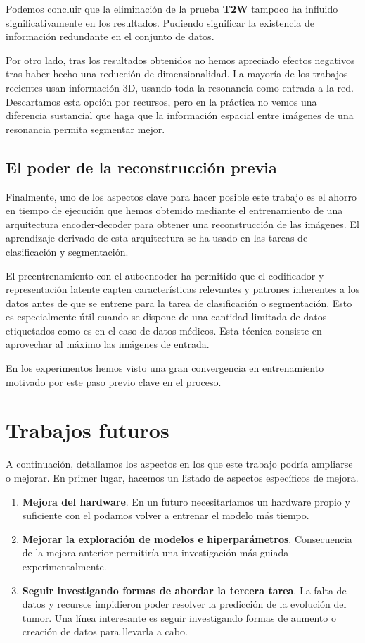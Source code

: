 Podemos concluir que la eliminación de la prueba \textbf{T2W} tampoco ha influido significativamente en los resultados. Pudiendo significar la existencia de información redundante en el conjunto de datos.

Por otro lado, tras los resultados obtenidos no hemos apreciado efectos negativos tras haber hecho una reducción de dimensionalidad. La mayoría de los trabajos recientes usan información 3D, usando toda la resonancia como entrada a la red. Descartamos esta opción por recursos, pero en la práctica no vemos una diferencia sustancial que haga que la información espacial entre imágenes de una resonancia permita segmentar mejor.


\subsection{El poder de la reconstrucción previa}

Finalmente, uno de los aspectos clave para hacer posible este trabajo es el ahorro en tiempo de ejecución que hemos obtenido mediante el entrenamiento de una arquitectura encoder-decoder para obtener una reconstrucción de las imágenes. El aprendizaje derivado de esta arquitectura se ha usado en las tareas de clasificación y segmentación.

El preentrenamiento con el autoencoder ha permitido que el codificador y representación latente capten características relevantes y patrones inherentes a los datos antes de que se entrene para la tarea de clasificación o segmentación. Esto es especialmente útil cuando se dispone de una cantidad limitada de datos etiquetados como es en el caso de datos médicos. Esta técnica consiste en aprovechar al máximo las imágenes de entrada.

En los experimentos hemos visto una gran convergencia en entrenamiento motivado por este paso previo clave en el proceso.

\section{Trabajos futuros}

A continuación, detallamos los aspectos en los que este trabajo podría ampliarse o mejorar. En primer lugar, hacemos un listado de aspectos específicos de mejora.

\begin{enumerate}
	\item \textbf{Mejora del hardware}. En un futuro necesitaríamos un hardware propio y suficiente con el podamos volver a entrenar el modelo más tiempo.
	\item \textbf{Mejorar la exploración de modelos e hiperparámetros}. Consecuencia de la mejora anterior permitiría una investigación más guiada experimentalmente.
	\item \textbf{Seguir investigando formas de abordar la tercera tarea}. La falta de datos y recursos impidieron poder resolver la predicción de la evolución del tumor. Una línea interesante es seguir investigando formas de aumento o creación de datos para llevarla a cabo.
\end{enumerate}

